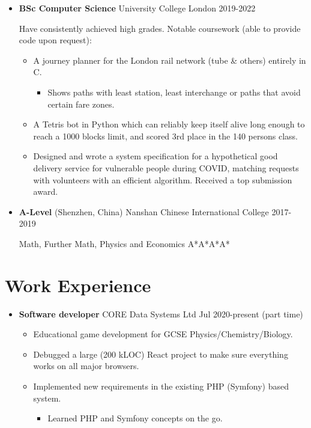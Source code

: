   \begin{itemize}
    \item \textbf{BSc Computer Science} \dashdiv{} University College London \dashdiv{} 2019-2022

      Have consistently achieved high grades. Notable coursework (able to provide code upon request):

      \begin{itemize}
        \item A journey planner for the\tflicon{} London rail network (tube \& others) entirely in C.

        \begin{itemize}
          \item Shows paths with least station, least interchange or paths that avoid certain fare zones.
        \end{itemize}

        \item A Tetris bot in Python which can reliably keep itself alive long enough to reach a 1000 blocks limit, and scored 3rd place in the 140 persons class.

        \item Designed and wrote a system specification for a hypothetical good delivery service for vulnerable people during COVID, matching requests with volunteers with an efficient algorithm. Received a top submission award.
      \end{itemize}

    \item \textbf{A-Level} \dashdiv{} (Shenzhen, China) Nanshan Chinese International College \dashdiv{} 2017-2019

      Math, Further Math, Physics and Economics \dashdiv{} A*A*A*A*
  \end{itemize}

  \section{Work Experience}

  \begin{itemize}
    \item \textbf{Software developer} \dashdiv{} CORE Data Systems Ltd \dashdiv{} Jul 2020-present (part time)

    \begin{itemize}
      \item Educational game development for GCSE Physics/Chemistry/Biology.
      \item Debugged a large (200 kLOC) React project to make sure everything works on all major browsers.
      \item Implemented new requirements in the existing PHP (Symfony) based system.
      \begin{itemize}
        \item Learned PHP and Symfony concepts on the go.
      \end{itemize}
    \end{itemize}
  \end{itemize}

